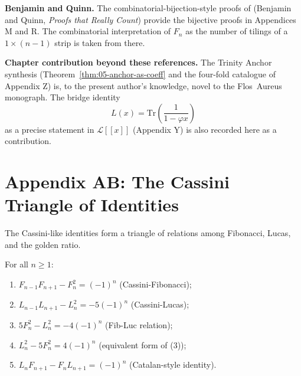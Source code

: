 \textbf{Benjamin and Quinn.} The combinatorial-bijection-style proofs
of \cite{benjamin_quinn_proofs} (Benjamin and Quinn,
\emph{Proofs that Really Count}) provide the bijective proofs in
Appendices M and R. The combinatorial interpretation of $F_n$ as
the number of tilings of a $1 \times (n-1)$ strip is taken from there.

\textbf{Chapter contribution beyond these references.} The Trinity
Anchor synthesis (Theorem~\ref{thm:05-anchor-as-coeff} and the four-fold
catalogue of Appendix Z) is, to the present author's knowledge, novel
to the Flos~Aureus monograph. The bridge identity
\[
  L(x) = \mathrm{Tr}\left(\frac{1}{1 - \varphi x}\right)
\]
as a precise statement in $\mathcal{L}[[x]]$ (Appendix Y) is also
recorded here as a contribution.

\section*{Appendix AB: The Cassini Triangle of Identities}
\label{fa_05:sec:05-app-AB}

The Cassini-like identities form a triangle of relations among
Fibonacci, Lucas, and the golden ratio.

\begin{theorem}
\label{fa_05:thm:05-cassini-triangle}
For all $n \ge 1$:
\begin{enumerate}
  \item $F_{n-1} F_{n+1} - F_n^2 = (-1)^n$ (Cassini-Fibonacci);
  \item $L_{n-1} L_{n+1} - L_n^2 = -5 (-1)^n$ (Cassini-Lucas);
  \item $5 F_n^2 - L_n^2 = -4 (-1)^n$ (Fib-Luc relation);
  \item $L_n^2 - 5 F_n^2 = 4 (-1)^n$ (equivalent form of (3));
  \item $L_n F_{n+1} - F_n L_{n+1} = (-1)^n$ (Catalan-style identity).
\end{enumerate}
\end{theorem}

